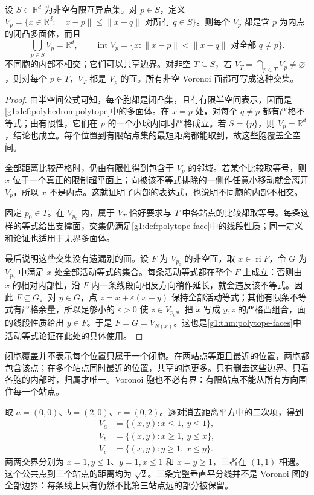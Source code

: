 \begin{proposition}\label{g1:prop:voronoi-cover}
	设 \(S\subset\mathbb R^d\) 为非空有限互异点集。对 \(p\in S\)，定义 \(V_p=\{x\in\mathbb R^d:\lVert x-p\rVert\le\lVert x-q\rVert\text{ 对所有 }q\in S\}\)。则每个 \(V_p\) 都是含 \(p\) 为内点的闭凸多面体，而且
	\[
		\bigcup_{p\in S}V_p=\mathbb R^d,
		\qquad
		\operatorname{int}V_p
		=\{x:\lVert x-p\rVert<\lVert x-q\rVert\text{ 对全部 }q\ne p\}.
	\]
	不同胞的内部不相交；它们可以共享边界。对非空 \(T\subseteq S\)，若 \(V_T=\bigcap_{p\in T}V_p\ne\varnothing\)，则对每个 \(p\in T\)，\(V_T\) 都是 \(V_p\) 的面。所有非空 Voronoi 面都可写成这种交集。
\end{proposition}
\begin{proof}
	由半空间公式可知，每个胞都是闭凸集，且有有限半空间表示，因而是\cref{g1:def:polyhedron-polytope}中的多面体。在 \(x=p\) 处，对每个 \(q\ne p\) 都有严格不等式；由有限性，它们在 \(p\) 的一个小球内同时严格成立。若 \(S=\{p\}\)，则 \(V_p=\mathbb R^d\)，结论也成立。每个位置到有限站点集的最短距离都能取到，故这些胞覆盖全空间。

	全部距离比较严格时，仍由有限性得到包含于 \(V_p\) 的邻域。若某个比较取等号，则 \(x\) 位于一个真正的限制超平面上；向被该不等式排除的一侧作任意小移动就会离开 \(V_p\)，所以 \(x\) 不是内点。这就证明了内部的表达式，也说明不同胞的内部不相交。

	固定 \(p_0\in T\)。在 \(V_{p_0}\) 内，属于 \(V_T\) 恰好要求与 \(T\) 中各站点的比较都取等号。每条这样的等式给出支撑面，交集仍满足\cref{g1:def:polytope-face}中的线段性质；同一定义和论证也适用于无界多面体。

	最后说明这些交集没有遗漏别的面。设 \(F\) 为 \(V_{p_0}\) 的非空面，取 \(x\in\operatorname{ri}F\)，令 \(G\) 为 \(V_{p_0}\) 中满足 \(x\) 处全部活动等式的集合。每条活动等式都在整个 \(F\) 上成立：否则由 \(x\) 的相对内部性，沿 \(F\) 内一条线段向相反方向稍作延长，就会违反该不等式。因此 \(F\subseteq G\)。对 \(y\in G\)，点 \(z=x+\varepsilon(x-y)\) 保持全部活动等式；其他有限条不等式有严格余量，所以足够小的 \(\varepsilon>0\) 使 \(z\in V_{p_0}\)。把 \(x\) 写成 \(y,z\) 的严格凸组合，面的线段性质给出 \(y\in F\)。于是 \(F=G=V_{N(x)}\)。这也是\cref{g1:thm:polytope-faces}中活动等式论证在此处的具体使用。
\end{proof}

闭胞覆盖并不表示每个位置只属于一个闭胞。在两站点等距且最近的位置，两胞都包含该点；在多个站点同时最近的位置，共享的胞更多。只有删去这些边界、只看各胞的内部时，归属才唯一。Voronoi 胞也不必有界：有限站点不能从所有方向围住每一个站点。

\begin{example}\label{g1:exm:three-site-voronoi}
	取 \(a=(0,0)\)、\(b=(2,0)\)、\(c=(0,2)\)。逐对消去距离平方中的二次项，得到
	\[
		\begin{aligned}
			V_a&=\{(x,y):x\le1,\ y\le1\},\\
			V_b&=\{(x,y):x\ge1,\ y\le x\},\\
			V_c&=\{(x,y):y\ge1,\ x\le y\}.
		\end{aligned}
	\]
	两两交界分别为 \(x=1,y\le1\)、\(y=1,x\le1\) 和 \(x=y\ge1\)，三者在 \((1,1)\) 相遇。这个公共点到三个站点的距离均为 \(\sqrt2\)。三条完整垂直平分线并不是 Voronoi 图的全部边界：每条线上只有仍然不比第三站点远的部分被保留。
\end{example}

